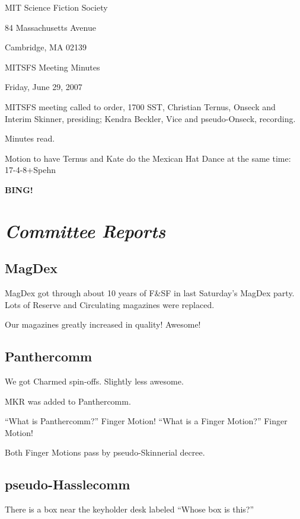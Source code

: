 \documentclass[10pt]{article}
\newcommand{\bing}{{\bf BING!} }
\newcommand{\goto}[1]{\bing \vskip 12pt \section*{{\em{#1}}}}
\begin{document}
\begin{center}

MIT Science Fiction Society

84 Massachusetts Avenue

Cambridge, MA 02139

\vspace{12pt}

MITSFS Meeting Minutes

Friday, June 29, 2007

\end{center}

\vspace{18pt}

\setlength{\parskip}{6pt}

\noindent
MITSFS meeting called to order, 1700 SST,
Christian Ternus, Onseck and Interim Skinner, presiding; Kendra Beckler, Vice and pseudo-Onseck, recording.

Minutes read.

Motion to have Ternus and Kate do the Mexican Hat Dance at the same time: 17-4-8+Spehn

\goto{Committee Reports}

\subsection*{MagDex}

MagDex got through about 10 years of F&SF in last Saturday's MagDex party.  Lots of Reserve and Circulating magazines were replaced.

Our magazines greatly increased in quality!  Awesome!

\subsection*{Panthercomm}

We got Charmed spin-offs.  Slightly less awesome.

MKR was added to Panthercomm.

``What is Panthercomm?''  Finger Motion!  ``What is a Finger Motion?''  Finger Motion!

Both Finger Motions pass by pseudo-Skinnerial decree.

\subsection*{pseudo-Hasslecomm}

There is a box near the keyholder desk labeled ``Whose box is this?''
\end{document}
